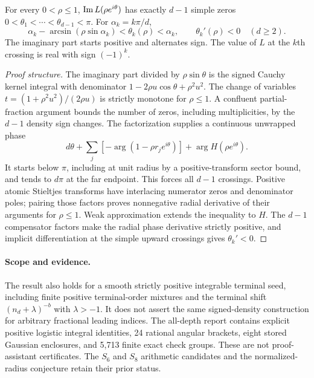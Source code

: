 \begin{theorem}
\label{ado:integration:angular}
For every $0<\rho\le1$, $\operatorname{Im} L(\rho e^{i\theta})$ has exactly
$d-1$ simple zeros $0<\theta_1<\cdots<\theta_{d-1}<\pi$. For
$\alpha_k=k\pi/d$,
\[
 \alpha_k-\arcsin(\rho\sin\alpha_k)<\theta_k(\rho)<\alpha_k,
 \qquad \theta_k'(\rho)<0\quad(d\ge2).
\]
The imaginary part starts positive and alternates sign. The value of $L$
at the $k$th crossing is real with sign $(-1)^k$.
\end{theorem}
\begin{proof}[Proof structure]
The imaginary part divided by $\rho\sin\theta$ is the signed Cauchy
kernel integral with denominator $1-2\rho u\cos\theta+\rho^2u^2$.
The change of variables $t=(1+\rho^2u^2)/(2\rho u)$ is strictly
monotone for $\rho\le1$. A confluent partial-fraction argument bounds
the number of zeros, including multiplicities, by the $d-1$ density
sign changes. The factorization supplies a continuous unwrapped phase
\[
 d\theta+\sum_j[-\arg(1-\rho r_je^{i\theta})]
                   +\arg H(\rho e^{i\theta}).
\]
It starts below $\pi$, including at unit radius by a positive-transform
sector bound, and tends to $d\pi$ at the far endpoint. This forces all
$d-1$ crossings. Positive atomic Stieltjes transforms have interlacing
numerator zeros and denominator poles; pairing those factors proves
nonnegative radial derivative of their arguments for $\rho\le1$.
Weak approximation extends the inequality to $H$. The $d-1$ compensator
factors make the radial phase derivative strictly positive, and implicit
differentiation at the simple upward crossings gives $\theta_k'<0$.
\end{proof}

\paragraph{Scope and evidence.}
The result also holds for a smooth strictly positive integrable terminal
seed, including finite positive terminal-order mixtures and the terminal
shift $(n_d+\lambda)^{-b}$ with $\lambda>-1$. It does not assert the
same signed-density construction for arbitrary fractional leading indices.
The all-depth report contains explicit positive logistic integral identities,
24 rational angular brackets, eight stored Gaussian enclosures, and
5,713 finite exact check groups. These are not proof-assistant certificates.
The $S_6$ and $S_8$ arithmetic candidates and the normalized-radius
conjecture retain their prior status.
